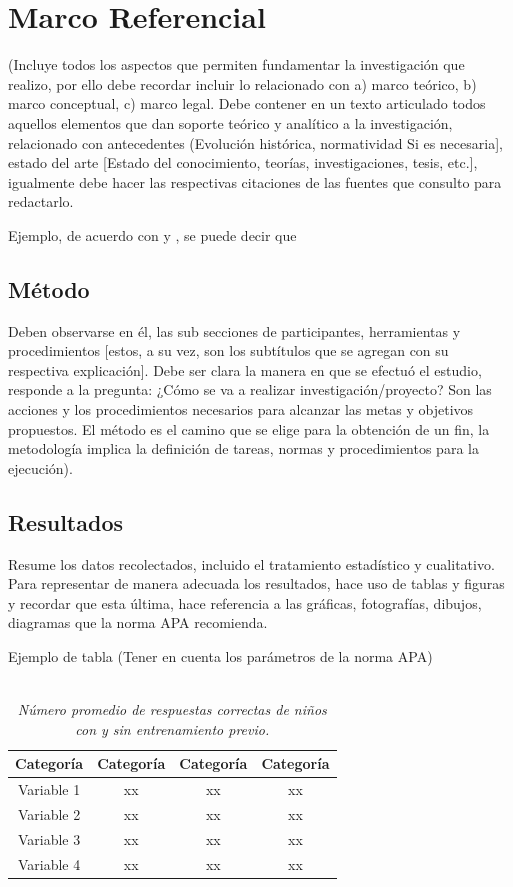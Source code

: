 \documentclass[11pt,openany]{book}
\begin{document}
\section{Marco Referencial}

(Incluye todos los aspectos que permiten fundamentar la investigación que realizo, por ello debe recordar incluir lo relacionado con a) marco teórico, b) marco conceptual, c) marco legal. Debe contener en un texto articulado todos aquellos elementos que dan soporte teórico y analítico a la investigación, relacionado con antecedentes (Evolución histórica, normatividad Si es necesaria], estado del arte [Estado del conocimiento, teorías, investigaciones, tesis, etc.], igualmente debe hacer las respectivas citaciones de las fuentes que consulto para redactarlo.

Ejemplo, de acuerdo con \parencite{Li2022} y \textcite{Vidas2021}, se puede decir que \lipsum[1]

\subsection{Método}

Deben observarse en él, las sub secciones de participantes, herramientas y procedimientos [estos, a su vez, son los subtítulos que se agregan con su respectiva explicación]. Debe ser clara la manera en que se efectuó el estudio, responde a la pregunta: ¿Cómo se va a realizar investigación/proyecto? Son las acciones y los procedimientos necesarios para alcanzar las metas y objetivos propuestos. El método es el camino que se elige para la obtención de un fin, la metodología implica la definición de tareas, normas y procedimientos para la ejecución).

\subsection{Resultados}

Resume los datos recolectados, incluido el tratamiento estadístico y cualitativo. Para representar de manera adecuada los resultados, hace uso de tablas y figuras y recordar que esta última, hace referencia a las gráficas, fotografías, dibujos, diagramas que la norma APA recomienda.

Ejemplo de tabla (Tener en cuenta los parámetros de la norma APA)

\begin{table}[H]
    \centering
    \caption{\justifying \\ \textit{Número promedio de respuestas correctas de niños con y sin entrenamiento previo.}}
    \begin{tabular}{cccc}
        \hline
        Categoría & Categoría & Categoría & Categoría \\
        \hline
        Variable 1 & xx & xx & xx \\
        Variable 2 & xx & xx & xx \\
        Variable 3 & xx & xx & xx \\
        Variable 4 & xx & xx & xx \\
         \hline
    \end{tabular}
    \label{tab:Tabla}
\end{table}
\end{document}
